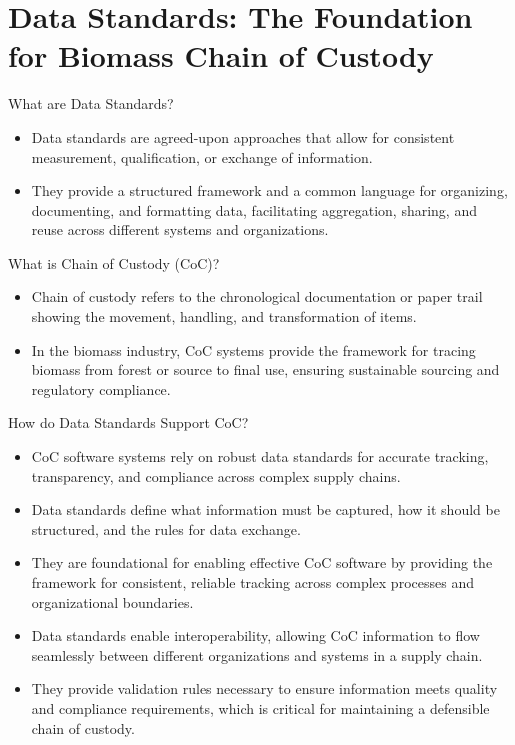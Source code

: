 \documentclass[presentation]{beamer}
\begin{document}
\section{Data Standards: The Foundation for Biomass Chain of Custody}
\label{data-standards-the-foundation-for-biomass-chain-of-custody}
\begin{frame}[label={sec:org2db7d49}]{What are Data Standards?}
\begin{itemize}
\item Data standards are agreed-upon approaches that allow for consistent measurement, qualification, or exchange of information.
\item They provide a structured framework and a common language for organizing, documenting, and formatting data, facilitating aggregation, sharing, and reuse across different systems and organizations.
\end{itemize}
\end{frame}
\begin{frame}[label={sec:orgfcea1e2}]{What is Chain of Custody (CoC)?}
\begin{itemize}
\item Chain of custody refers to the chronological documentation or paper trail showing the movement, handling, and transformation of items.
\item In the biomass industry, CoC systems provide the framework for tracing biomass from forest or source to final use, ensuring sustainable sourcing and regulatory compliance.
\end{itemize}
\end{frame}
\begin{frame}[label={sec:orga51c645}]{How do Data Standards Support CoC?}
\begin{itemize}
\item CoC software systems rely on robust data standards for accurate tracking, transparency, and compliance across complex supply chains.
\item Data standards define what information must be captured, how it should be structured, and the rules for data exchange.
\item They are foundational for enabling effective CoC software by providing the framework for consistent, reliable tracking across complex processes and organizational boundaries.
\item Data standards enable interoperability, allowing CoC information to flow seamlessly between different organizations and systems in a supply chain.
\item They provide validation rules necessary to ensure information meets quality and compliance requirements, which is critical for maintaining a defensible chain of custody.
\end{itemize}
\end{frame}
\end{document}
